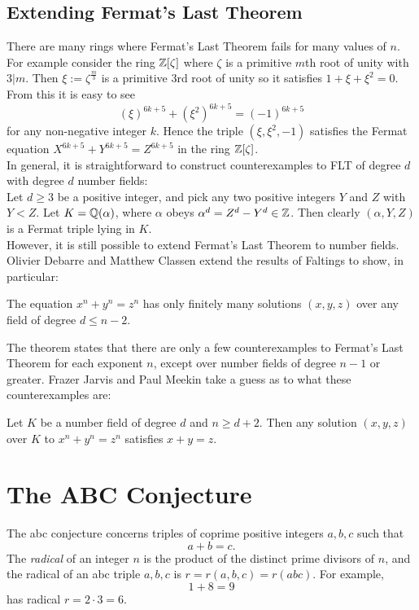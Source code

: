 \documentclass{book}
\begin{document}
\subsection{Extending Fermat's Last Theorem} %

There are many rings where Fermat's Last Theorem fails for many values of
$n$. For example consider the ring $\mathbb{Z}[\zeta]$ where $\zeta$ is a primitive
$m$th root of unity with $3 | m$. Then $\xi := \zeta^\frac{m}{3}$ is
a primitive $3$rd root of unity so it satisfies $1+\xi+\xi^2=0$.
From this it is easy to see
$$
(\xi)^{6k+5} + (\xi^2)^{6k+5} = (-1)^{6k+5}
$$
for any non-negative integer $k$. Hence the triple $(\xi,\xi^2,-1)$ satisfies
the Fermat equation $X^{6k+5}+Y^{6k+5}=Z^{6k+5}$ in the ring $\mathbb{Z}[\zeta]$. \\

In general, it is straightforward to construct counterexamples to FLT
of degree $d$ with degree $d$ number fields: \\
Let $d\ge 3$ be a positive integer, and pick any two positive integers
$Y$ and $Z$ with $Y<Z$. Let $K = \mathbb{Q}(\alpha)$, where $\alpha$ obeys
$\alpha^d = Z^d-Y^d \in \mathbb{Z}$. Then clearly $(\alpha,Y,Z)$ is a Fermat triple lying in $K$. \\

However, it is still possible to extend Fermat's Last Theorem to number fields. Olivier Debarre and Matthew Classen \cite{deb-cla} extend the results of Faltings to show, in particular:
\begin{theorem}\label{th:dc}
The equation $x^n+y^n=z^n$ has only finitely many solutions $(x,y,z)$ over any field of degree $d\leq n-2$.
\end{theorem}

The theorem states that there are only a few counterexamples to Fermat's Last Theorem for each exponent $n$, except over number fields of degree $n-1$ or greater. Frazer Jarvis and Paul Meekin \cite{jar} take a guess as to what these counterexamples are:
\begin{conjecture}\label{conj:jarv}
Let $K$ be a number field of degree $d$ and $n\geq d+2$. Then any solution $(x,y,z)$ over $K$ to $x^n+y^n=z^n$ satisfies $x+y=z$.
\end{conjecture}

\section{The ABC Conjecture}
The abc conjecture
concerns triples of coprime positive integers $a,b,c$  such that
$$
a+b = c.
$$
The {\em radical} of an integer $n$ is the product
of the distinct prime divisors of $n$, and the radical
of an abc triple $a,b,c$ is $r=r(a,b,c)=r(abc)$.
For example,
$$
  1 + 8 = 9
$$
has radical $r=2\cdot 3=6$.
\end{document}

